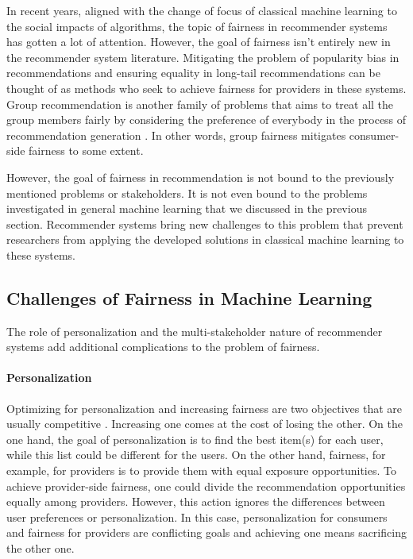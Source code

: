     In recent years, aligned with the change of focus of classical machine learning to the social impacts of algorithms, the topic of fairness in recommender systems has gotten a lot of attention. However, the goal of fairness isn't entirely new in the recommender system literature. Mitigating the problem of popularity bias in recommendations \cite{popbias2018} and ensuring equality in long-tail recommendations \cite{ferraro2019} can be thought of as methods who seek to achieve fairness for providers in these systems. Group recommendation is another family of problems that aims to treat all the group members fairly by considering the preference of everybody in the process of recommendation generation \cite{kaya2020}. In other words, group fairness mitigates consumer-side fairness to some extent. 
    
    However, the goal of fairness in recommendation is not bound to the previously mentioned problems or stakeholders. It is not even bound to the problems investigated in general machine learning that we discussed in the previous section. Recommender systems bring new challenges to this problem that prevent researchers from applying the developed solutions in classical machine learning to these systems. 

    \subsection{Challenges of Fairness in Machine Learning}
        The role of personalization and the multi-stakeholder nature of recommender systems add additional complications to the problem of fairness.
        
        \vspace{0.25cm}
        \noindent \paragraph{Personalization}
        \vspace{0.25cm}
    
            Optimizing for personalization and increasing fairness are two objectives that are usually competitive \cite{modani2017fairness}. Increasing one comes at the cost of losing the other. On the one hand, the goal of personalization is to find the best item(s) for each user, while this list could be different for the users. On the other hand, fairness, for example, for providers is to provide them with equal exposure opportunities. To achieve provider-side fairness, one could divide the recommendation opportunities equally among providers. However, this action ignores the differences between user preferences or personalization. In this case, personalization for consumers and fairness for providers are conflicting goals and achieving one means sacrificing the other one.
            
